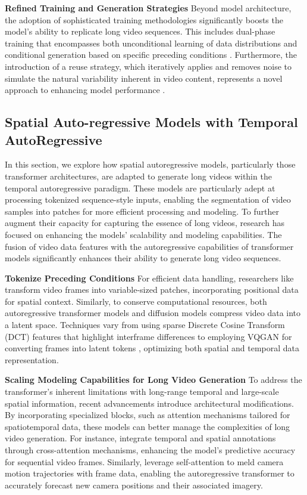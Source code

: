 \documentclass{article}
\begin{document}
\noindent\textbf{Refined Training and Generation Strategies}
Beyond model architecture, the adoption of sophisticated training methodologies significantly boosts the model's ability to replicate long video sequences. This includes dual-phase training that encompasses both unconditional learning of data distributions and conditional generation based on specific preceding conditions \citep{PVDM}. Furthermore, the introduction of a reuse strategy, which iteratively applies and removes noise to simulate the natural variability inherent in video content, represents a novel approach to enhancing model performance \citep{VidRD}.
\subsection{Spatial Auto-regressive Models with Temporal AutoRegressive}
In this section, we explore how spatial autoregressive models, particularly those transformer architectures, are adapted to generate long videos within the temporal autoregressive paradigm. These models are particularly adept at processing tokenized sequence-style inputs, enabling the segmentation of video samples into patches for more efficient processing and modeling. To further augment their capacity for capturing the essence of long videos, research has focused on enhancing the models' scalability and modeling capabilities. The fusion of video data features with the autoregressive capabilities of transformer models significantly enhances their ability to generate long video sequences.


\noindent\textbf{Tokenize Preceding Conditions}
For efficient data handling, researchers like \cite{NUWA-infinity} transform video frames into variable-sized patches, incorporating positional data for spatial context. Similarly, to conserve computational resources, both autoregressive transformer models and diffusion models compress video data into a latent space. Techniques vary from using sparse Discrete Cosine Transform (DCT) features that highlight interframe differences \citep{transframer} to employing VQGAN for converting frames into latent tokens \citep{Look}, optimizing both spatial and temporal data representation.


\noindent\textbf{Scaling Modeling Capabilities for Long Video Generation}
To address the transformer's inherent limitations with long-range temporal and large-scale spatial information, recent advancements introduce architectural modifications. By incorporating specialized blocks, such as attention mechanisms tailored for spatiotemporal data, these models can better manage the complexities of long video generation. For instance, \cite{transframer} integrate temporal and spatial annotations through cross-attention mechanisms, enhancing the model's predictive accuracy for sequential video frames. Similarly, \cite{Look} leverage self-attention to meld camera motion trajectories with frame data, enabling the autoregressive transformer to accurately forecast new camera positions and their associated imagery.
\end{document}
